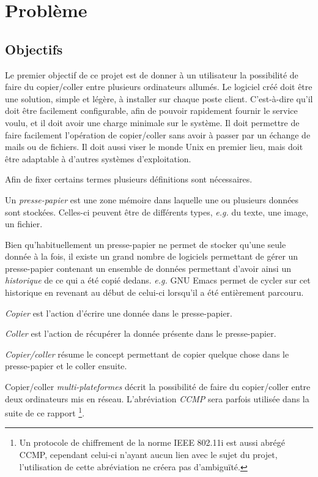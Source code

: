 \chapter{Problème}\label{ch:1}
\renewcommand{\leftmark}{\thechapter.~~Problème}
\section{Objectifs}
Le premier objectif de ce projet est de donner à un utilisateur la possibilité
de faire du copier/coller entre plusieurs ordinateurs allumés. Le logiciel
créé doit être une solution, simple et légère, à installer sur chaque
poste client. C'est-à-dire qu'il doit être facilement configurable, afin
de pouvoir rapidement fournir le service voulu, et il doit avoir
une charge minimale sur le système.
Il doit permettre de faire facilement l'opération de copier/coller
sans avoir à passer par un échange de mails ou de fichiers.
Il doit aussi viser le monde Unix en premier lieu, mais doit être adaptable
à d'autres systèmes d'exploitation.

Afin de fixer certains termes plusieurs définitions sont nécessaires.
\begin{defi}
  Un \emph{presse-papier} est une zone mémoire dans laquelle une ou
  plusieurs données sont stockées. Celles-ci peuvent être de différents types,
  \emph{e.g.} du texte, une image, un fichier.
\end{defi}
\begin{rem}
  Bien qu'habituellement un presse-papier ne permet de stocker qu'une seule
  donnée à la fois, il existe un grand nombre de logiciels permettant
  de gérer un presse-papier contenant un ensemble de données permettant
  d'avoir ainsi un \emph{historique} de ce qui a été copié dedans.
  \emph{e.g.} GNU Emacs \cite{emacs}
  permet de cycler sur cet historique en revenant au début de celui-ci
  lorsqu'il a été entièrement parcouru.
\end{rem}
\begin{defi}
  \emph{Copier} est l'action d'écrire une donnée dans le presse-papier.
\end{defi}
\begin{defi}
  \emph{Coller} est l'action de récupérer la donnée présente dans le
  presse-papier.
\end{defi}
\begin{defi}
  \emph{Copier/coller} résume le concept permettant de copier
  quelque chose dans le presse-papier et le coller ensuite.
\end{defi}
\begin{defi}
  Copier/coller \emph{multi-plateformes} décrit la possibilité de faire
  du copier/coller entre deux ordinateurs mis en réseau. L'abréviation
  \emph{CCMP} sera parfois utilisée dans la suite de ce rapport
  \footnote{Un protocole de chiffrement de la norme IEEE 802.11i est
  aussi abrégé CCMP, cependant celui-ci n'ayant aucun lien avec le sujet
  du projet, l'utilisation de cette abréviation ne créera pas d'ambiguïté.}.
\end{defi}

